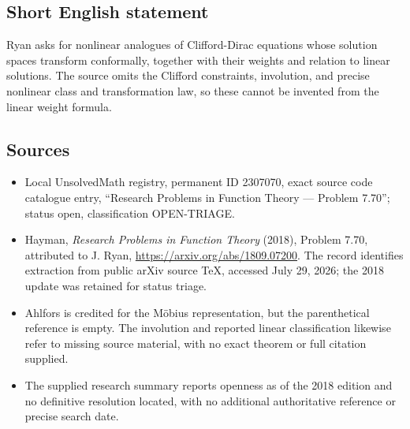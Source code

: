 \documentclass[11pt]{article}
\begin{document}
\subsection{Short English statement}
Ryan asks for nonlinear analogues of Clifford-Dirac equations whose solution spaces transform conformally, together with their weights and relation to linear solutions. The source omits the Clifford constraints, involution, and precise nonlinear class and transformation law, so these cannot be invented from the linear weight formula.
\subsection{Sources}
\begin{itemize}
\item Local UnsolvedMath registry, permanent ID 2307070, exact source code catalogue entry, ``Research Problems in Function Theory --- Problem 7.70''; status open, classification OPEN-TRIAGE.
\item Hayman, \emph{Research Problems in Function Theory} (2018), Problem 7.70, attributed to J. Ryan, \url{https://arxiv.org/abs/1809.07200}. The record identifies extraction from public arXiv source TeX, accessed July 29, 2026; the 2018 update was retained for status triage.
\item Ahlfors is credited for the M\"obius representation, but the parenthetical reference is empty. The involution and reported linear classification likewise refer to missing source material, with no exact theorem or full citation supplied.
\item The supplied research summary reports openness as of the 2018 edition and no definitive resolution located, with no additional authoritative reference or precise search date.
\end{itemize}
\end{document}
